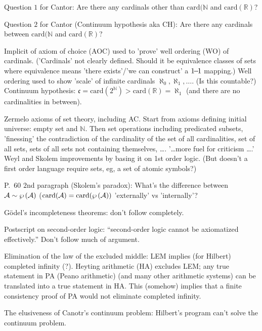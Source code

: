 Question $1$ for Cantor:
\hfill\break
Are there any cardinals other than 
$\mathrm{card}(\mathbb{N}$ and 
$\mathrm{card}(\mathbb{R})$?

Question $2$ for Cantor (Continuum hypothesis aka CH):
\hfill\break
Are there any cardinals between
$\mathrm{card}(\mathbb{N}$ and 
$\mathrm{card}(\mathbb{R})$?

Implicit of axiom of choice (AOC) used to 'prove' 
well ordering (WO) of cardinals.
('Cardinals' not clearly defined.
Should it be equivalence classes of sets where
equivalence means 'there exists'/'we can construct'
a $1{\!}{-}{\!}1$ mapping.)
\hfill\break
Well ordering used to show 'scale' of infinite cardinals
$\aleph_0, \aleph_1, \ldots$. (Is this countable?)
\hfill\break
Continuum hypothesis: 
$\mathfrak{c} = \mathrm{card}(2^{\mathbb{N}}) 
> \mathrm{card}(\mathbb{R}) = \aleph_1$
(and there are no cardinalities in between).

Zermelo axioms of set theory, including AC.
Start from axioms defining initial universe:
empty set and $\mathbb{N}$.
Then set operations including predicated subsets,
'finessing' the contradiction of the
cardinality of the set of all cardinalities,
set of all sets,
sets of all sets not containing themselves, 
\ldots.
\hfill\break
'\ldots more fuel for criticism \ldots.'
Weyl and Skolem improvements by basing it on 1st order logic.
(But doesn't a first order language require sets,
eg, a set of atomic symbols?)

P.~$60$ $2$nd paragraph (Skolem's paradox):
\hfill\break
What's the difference between $\mathcal{A} \sim  \wp \left( \mathcal{A} \right) $ 
($\mathrm{card}(\mathcal{A})=\mathrm{card}(\mathcal{ \wp \left( \mathcal{A} \right) })$
 'externally' vs 'internally'?

\textsf{G\"{o}del's incompleteness theorems:}
don't follow completely.

\textsf{Postscript on second-order logic:}
``second-order logic cannot be axiomatized effectively.''
Don't follow much of argument.

\textsf{Elimination of the law of the excluded middle:}
\hfill\break
LEM implies (for Hilbert) completed infinity (?).
\hfill\break
Heyting arithmetic (HA) excludes LEM;
any true statement in PA (Peano arithmetic) 
(and many other arithmetic systems)
can be translated into
a true statement in HA.
\hfill\break
This (somehow) implies that a finite consistency proof
of PA would not eliminate completed infinity.

\textsf{The elusiveness of Canotr's continuum problem:}
\hfill\break
Hilbert's program can't solve the continuum problem.


